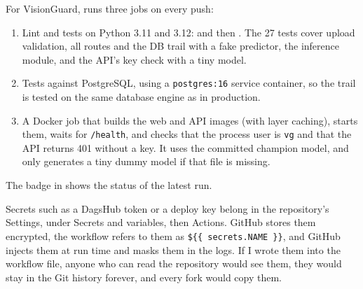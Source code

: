 For VisionGuard,  runs three jobs on every push:
\begin{enumerate}
\item Lint and tests on Python 3.11 and 3.12:  and then . The 27
tests cover upload validation, all routes and the DB trail with a fake predictor, the inference
module, and the API's key check with a tiny model.
\item Tests against PostgreSQL, using a \texttt{postgres:16} service container, so the trail is
tested on the same database engine as in production.
\item A Docker job that builds the web and API images (with layer caching), starts them, waits for
\texttt{/health}, and checks that the process user is \texttt{vg} and that the API returns 401
without a key. It uses the committed champion model, and only generates a tiny dummy model if that
file is missing.
\end{enumerate}
The badge in  shows the status of the latest run.

Secrets such as a DagsHub token or a deploy key belong in the repository's Settings, under
Secrets and variables, then Actions. GitHub stores them encrypted, the workflow refers to them as
\texttt{\$\{\{ secrets.NAME \}\}}, and GitHub injects them at run time and masks them in the logs.
If I wrote them into the workflow file, anyone who can read the repository would see them, they
would stay in the Git history forever, and every fork would copy them.

